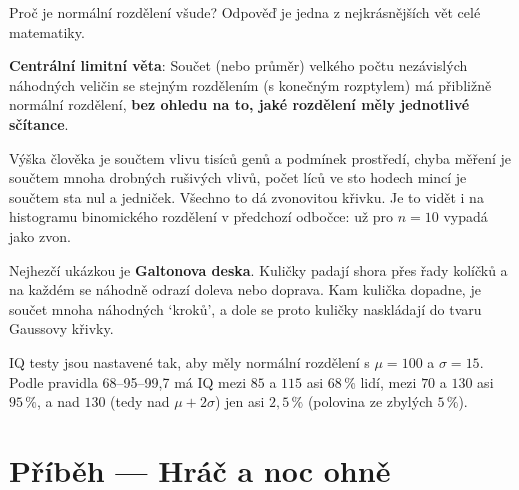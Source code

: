 Proč je normální rozdělení všude? Odpověď je jedna z nejkrásnějších vět celé matematiky.

\begin{definitionbox}
  \textbf{Centrální limitní věta}: Součet (nebo průměr) velkého počtu nezávislých náhodných veličin se stejným rozdělením (s konečným rozptylem) má přibližně normální rozdělení, \textbf{bez ohledu na to, jaké rozdělení měly jednotlivé sčítance}.
\end{definitionbox}

Výška člověka je součtem vlivu tisíců genů a podmínek prostředí, chyba měření je součtem mnoha drobných rušivých vlivů, počet líců ve sto hodech mincí je součtem sta nul a jedniček. Všechno to dá zvonovitou křivku. Je to vidět i na histogramu binomického rozdělení v předchozí odbočce: už pro $n = 10$ vypadá jako zvon.

Nejhezčí ukázkou je \textbf{Galtonova deska}. Kuličky padají shora přes řady kolíčků a na každém se náhodně odrazí doleva nebo doprava. Kam kulička dopadne, je součet mnoha náhodných `kroků', a dole se proto kuličky naskládají do tvaru Gaussovy křivky.
\begin{center}
\end{center}

\begin{example}
  IQ testy jsou nastavené tak, aby měly normální rozdělení s $\mu = 100$ a $\sigma = 15$. Podle pravidla 68--95--99,7 má IQ mezi $85$ a $115$ asi $68\,\%$ lidí, mezi $70$ a $130$ asi $95\,\%$, a nad $130$ (tedy nad $\mu + 2\sigma$) jen asi $2{,}5\,\%$ (polovina ze zbylých $5\,\%$).
\end{example}

\section{Příběh --- Hráč a noc ohně}

